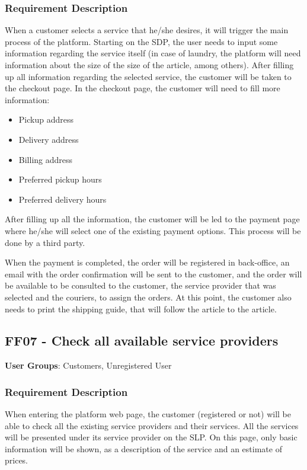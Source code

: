 \subsubsection{Requirement Description}
When a customer selects a service that he/she desires, it will trigger the main process of the platform. Starting on the \gls{SDP}, the user needs to input some information regarding the service itself (in case of laundry, the platform will need information about the size of the size of the article, among others). After filling up all information regarding the selected service, the customer will be taken to the checkout page. In the checkout page, the customer will need to fill more information:
\begin{itemize}
    \item Pickup address
    \item Delivery address
    \item Billing address
    \item Preferred pickup hours
    \item Preferred delivery hours
\end{itemize}

After filling up all the information, the customer will be led to the payment page where he/she will select one of the existing payment options. This process will be done by a third party.
\par 
When the payment is completed, the order will be registered in back-office, an email with the order confirmation will be sent to the customer, and the order will be available to be consulted to the customer, the service provider that was selected and the couriers, to assign the orders.
At this point, the customer also needs to print the shipping guide, that will follow the article to the article.


\subsection{FF07 - Check all available service providers}
\textbf{User Groups}: Customers, Unregistered User

\subsubsection{Requirement Description}
When entering the platform web page, the customer (registered or not) will be able to check all the existing service providers and their services. All the services will be presented under its service provider on the \gls{SLP}. On this page, only basic information will be shown, as a description of the service and an estimate of prices.

